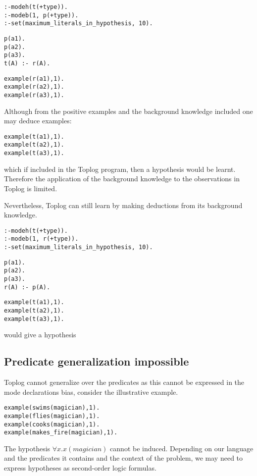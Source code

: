 \begin{lstlisting}
:-modeh(t(+type)).
:-modeb(1, p(+type)).
:-set(maximum_literals_in_hypothesis, 10).
\end{lstlisting}
\begin{minipage}[t]{.40\textwidth}
\begin{lstlisting}
p(a1).
p(a2).
p(a3).
t(A) :- r(A).
\end{lstlisting}
\end{minipage}
\begin{minipage}[t]{.40\textwidth}
\begin{lstlisting}
example(r(a1),1).
example(r(a2),1).
example(r(a3),1).
\end{lstlisting}
\end{minipage}

Although from the positive examples and the background knowledge included one may deduce examples:
\begin{lstlisting}
example(t(a1),1).
example(t(a2),1).
example(t(a3),1).
\end{lstlisting}
which if included in the Toplog program, then a hypothesis
 would be learnt.
Therefore the application of the background knowledge to the observations in Toplog is limited.

Nevertheless, Toplog can still learn by making deductions from its background knowledge.

\begin{lstlisting}
:-modeh(t(+type)).
:-modeb(1, r(+type)).
:-set(maximum_literals_in_hypothesis, 10).
\end{lstlisting}
\begin{minipage}[t]{.35\textwidth}
\begin{lstlisting}
p(a1).
p(a2).
p(a3).
r(A) :- p(A).
\end{lstlisting}
\end{minipage}
\begin{minipage}[t]{.20\textwidth}
\begin{lstlisting}
example(t(a1),1).
example(t(a2),1).
example(t(a3),1).
\end{lstlisting}
\end{minipage}

would give a hypothesis 

\subsection{Predicate generalization impossible}
Toplog cannot generalize over the predicates as this cannot be expressed in the mode declarations bias, consider the illustrative example.
\begin{lstlisting}
example(swims(magician),1).
example(flies(magician),1).
example(cooks(magician),1).
example(makes_fire(magician),1).
\end{lstlisting}
The hypothesis $\forall x. x(magician)$ cannot be induced. Depending on our language and the predicates it contains and the context of the problem, we may need to express hypotheses as second-order logic formulas.

